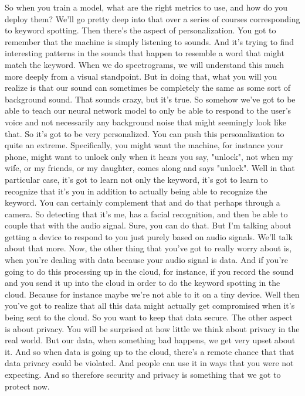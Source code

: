 So when you train a model, what are the right metrics to use,
and how do you deploy them?
We'll go pretty deep into that over a series of courses
corresponding to keyword spotting.
Then there's the aspect of personalization.
You got to remember that the machine is simply listening to sounds.
And it's trying to find interesting patterns
in the sounds that happen to resemble a word that might match the keyword.
When we do spectrograms, we will understand this much more deeply
from a visual standpoint.
But in doing that, what you will you realize
is that our sound can sometimes be completely the same
as some sort of background sound.
That sounds crazy, but it's true.
So somehow we've got to be able to teach our neural network model to only
be able to respond to the user's voice and not necessarily any background
noise that might seemingly look like that.
So it's got to be very personalized.
You can push this personalization to quite an extreme.
Specifically, you might want the machine, for instance your phone,
might want to unlock only when it hears you
say, "unlock", not when my wife, or my friends, or my daughter,
comes along and says "unlock".
Well in that particular case, it's got to learn not only the keyword,
it's got to learn to recognize that it's you in addition to actually
being able to recognize the keyword.
You can certainly complement that and do that perhaps through a camera.
So detecting that it's me, has a facial recognition,
and then be able to couple that with the audio signal.
Sure, you can do that.
But I'm talking about getting a device to respond to you just purely based
on audio signals.
We'll talk about that more.
Now, the other thing that you've got to really worry about
is, when you're dealing with data because your audio signal is data.
And if you're going to do this processing up in the cloud,
for instance, if you record the sound and you send it up into the cloud
in order to do the keyword spotting in the cloud.
Because for instance maybe we're not able to it on a tiny device.
Well then you've got to realize that all this data might actually
get compromised when it's being sent to the cloud.
So you want to keep that data secure.
The other aspect is about privacy.
You will be surprised at how little we think about privacy in the real world.
But our data, when something bad happens, we get very upset about it.
And so when data is going up to the cloud,
there's a remote chance that that data privacy could be violated.
And people can use it in ways that you were not expecting.
And so therefore security and privacy is something that we got to protect now.
